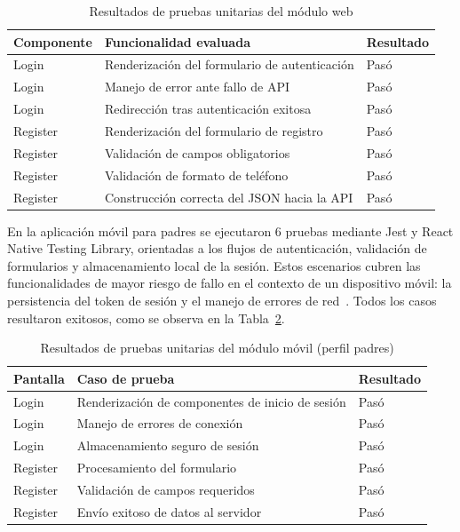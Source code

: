 				\begin{table}[H]
					\centering\small
					\caption{Resultados de pruebas unitarias del módulo web}
					\label{tab:pruebas_web}
					\begin{tabular}{p{3cm}p{8cm}p{2.5cm}}
						\hline
						\textbf{Componente} & \textbf{Funcionalidad evaluada} & \textbf{Resultado}\\
						\hline
						Login & Renderización del formulario de autenticación & Pasó\\
						Login & Manejo de error ante fallo de API & Pasó\\
						Login & Redirección tras autenticación exitosa & Pasó\\
						Register & Renderización del formulario de registro & Pasó\\
						Register & Validación de campos obligatorios & Pasó\\
						Register & Validación de formato de teléfono & Pasó\\
						Register & Construcción correcta del JSON hacia la API & Pasó\\
						\hline
					\end{tabular}
				\end{table}
				\tblnote
				
				En la aplicación móvil para padres se ejecutaron 6 pruebas mediante Jest y React Native Testing Library, orientadas a los flujos de autenticación, validación de formularios y almacenamiento local de la sesión. Estos escenarios cubren las funcionalidades de mayor riesgo de fallo en el contexto de un dispositivo móvil: la persistencia del token de sesión y el manejo de errores de red~\cite{Fowler2002}. Todos los casos resultaron exitosos, como se observa en la Tabla~\ref{tab:pruebas_movil_padres}.
				
				\begin{table}[H]
					\centering\small
					\caption{Resultados de pruebas unitarias del módulo móvil (perfil padres)}
					\label{tab:pruebas_movil_padres}
					\begin{tabular}{p{3cm}p{8cm}p{2.5cm}}
						\hline
						\textbf{Pantalla} & \textbf{Caso de prueba} & \textbf{Resultado}\\
						\hline
						Login & Renderización de componentes de inicio de sesión & Pasó\\
						Login & Manejo de errores de conexión & Pasó\\
						Login & Almacenamiento seguro de sesión & Pasó\\
						Register & Procesamiento del formulario & Pasó\\
						Register & Validación de campos requeridos & Pasó\\
						Register & Envío exitoso de datos al servidor & Pasó\\
						\hline
					\end{tabular}
				\end{table}
				\tblnote
				
